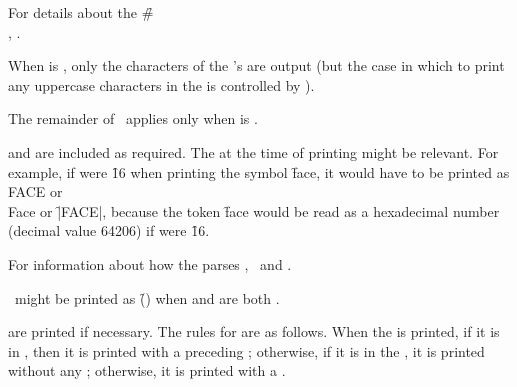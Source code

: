 For details about the \f{\#\\} , \seesection\SharpsignBackslash.

\endsubsubsection%

When  is ,
only the characters of the 's  are output 
(but the case in which to print any uppercase characters in the  is 
controlled by ).

The remainder of \thissection\ applies only when  is .

 and  are included as required.  
The  at the time of printing might be relevant.
For example, if  were \f{16} 
when printing the symbol \f{face}, it would have to be printed as
\f{\\FACE} or \f{\\Face} or \f{|FACE|}, 
because the token \f{face} would be read as a hexadecimal
number (decimal value 64206) if  were \f{16}.

For information about how the  parses ,
\seesection\SymbolTokens\ and \secref\SharpsignColon.

\nil\ might be printed as \f{()} when  
and  are both .


 are printed if necessary.
The rules for  are as follows.
When the  is printed, if it is in , 
then it is printed with a preceding ; otherwise, if
it is  in the , it is printed without any
; otherwise, it is printed with a .

